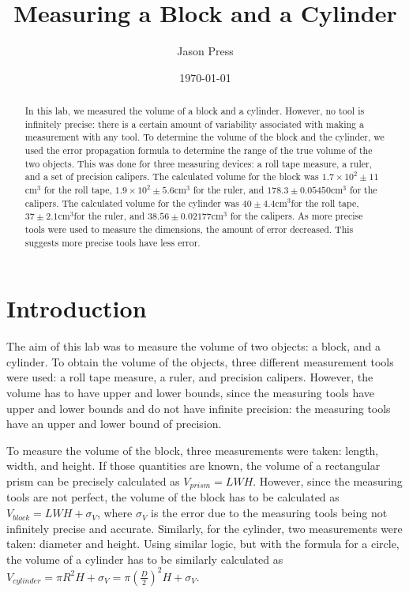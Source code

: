 \documentclass[12pt]{article}
\author{Jason Press}
\date{\today}
\title{Measuring a Block and a Cylinder}
\begin{document}
\maketitle
\begin{abstract}


In this lab, we measured the volume of a block and a cylinder. However, no tool is infinitely precise: there is a certain amount of variability associated with making a measurement with any tool. To determine the volume of the block and the cylinder, we used the error propagation formula to determine the range of the true volume of the two objects. This was done for three measuring devices: a roll tape measure, a ruler, and a set of precision calipers. The calculated volume for the block was \(1.7\times10^{2}\pm11\)cm\(^{3}\) for the roll tape, \(1.9\times10^{2}\pm5.6\)cm\(^{3}\) for the ruler, and \(178.3\pm0.05450\)cm\(^{3}\) for the calipers. The calculated volume for the cylinder was \(40\pm4.4\)cm\(^{3}\)for the roll tape, \(37\pm2.1\)cm\(^{3}\)for the ruler, and \(38.56\pm0.02177\)cm\(^{3}\) for the calipers. As more precise tools were used to measure the dimensions, the amount of error decreased. This suggests more precise tools have less error.
\end{abstract}
\section{Introduction}
\label{sec:orgf88ea1c}

The aim of this lab was to measure the volume of two objects: a block, and a cylinder. To obtain the volume of the objects, three different measurement tools were used: a roll tape measure, a ruler, and precision calipers. However, the volume has to have upper and lower bounds, since the measuring tools have upper and lower bounds and do not have infinite precision: the measuring tools have an upper and lower bound of precision.

To measure the volume of the block, three measurements were taken: length, width, and height. If those quantities are known, the volume of a rectangular prism can be precisely calculated as \(V_{prism}=LWH\). However, since the measuring tools are not perfect, the volume of the block has to be calculated as \(V_{block}=LWH+\sigma_{V}\), where \(\sigma_{V}\) is the error due to the measuring tools being not infinitely precise and accurate. Similarly, for the cylinder, two measurements were taken: diameter and height. Using similar logic, but with the formula for a circle, the volume of a cylinder has to be similarly calculated as \(V_{cylinder}=\pi R^{2}H + \sigma_{V}=\pi (\frac{D}{2})^{2}H+\sigma_{V}\).
\end{document}
